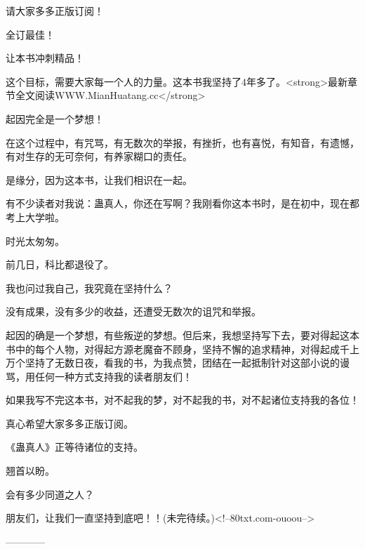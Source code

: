 \begin{this_body}
请大家多多正版订阅！

全订最佳！

让本书冲刺精品！

这个目标，需要大家每一个人的力量。这本书我坚持了4年多了。<strong>最新章节全文阅读WWW.MianHuatang.cc</strong>

起因完全是一个梦想！

在这个过程中，有咒骂，有无数次的举报，有挫折，也有喜悦，有知音，有遗憾，有对生存的无可奈何，有养家糊口的责任。

是缘分，因为这本书，让我们相识在一起。

有不少读者对我说：蛊真人，你还在写啊？我刚看你这本书时，是在初中，现在都考上大学啦。

时光太匆匆。

前几日，科比都退役了。

我也问过我自己，我究竟在坚持什么？

没有成果，没有多少的收益，还遭受无数次的诅咒和举报。

起因的确是一个梦想，有些叛逆的梦想。但后来，我想坚持写下去，要对得起这本书中的每个人物，对得起方源老魔奋不顾身，坚持不懈的追求精神，对得起成千上万个坚持了无数日夜，看我的书，为我点赞，团结在一起抵制针对这部小说的谩骂，用任何一种方式支持我的读者朋友们！

如果我写不完这本书，对不起我的梦，对不起我的书，对不起诸位支持我的各位！

真心希望大家多多正版订阅。

《蛊真人》正等待诸位的支持。

翘首以盼。

会有多少同道之人？

朋友们，让我们一直坚持到底吧！！(未完待续。)<!--80txt.com-ouoou-->

------------

\end{this_body}

